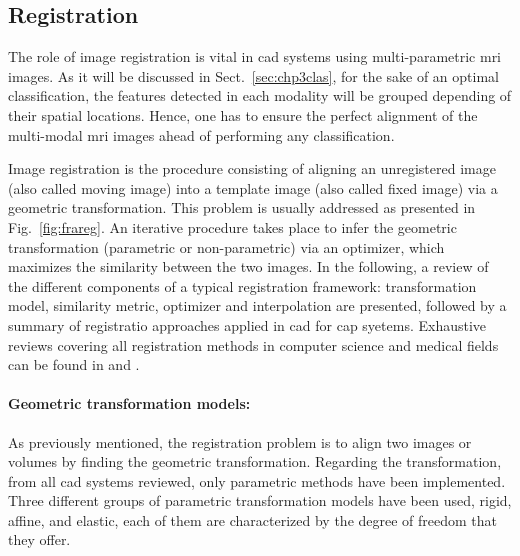 \subsection{Registration}\label{subsec:chp3img-reg:reg}


The role of image registration is vital in \ac{cad} systems using multi-parametric \ac{mri} images. 
As it will be discussed in Sect.~\ref{sec:chp3clas}, for the sake of an optimal classification, the features detected in each modality will be grouped depending of their spatial locations. 
Hence, one has to ensure the perfect alignment of the multi-modal \ac{mri} images ahead of performing any classification.

Image registration is the procedure consisting of aligning an unregistered image (also called moving image) into a template image (also called fixed image) via a geometric transformation.
This problem is usually addressed as presented in Fig.~\ref{fig:frareg}.
An iterative procedure takes place to infer the geometric transformation (parametric or non-parametric) via an optimizer, which maximizes the similarity between the two images.
In the following, a review of the different components of a typical registration framework: transformation model, similarity metric, optimizer and interpolation are presented, followed by a summary of registratio approaches applied in \ac{cad} for \ac{cap} syetems.
Exhaustive reviews covering all registration methods in computer science and medical fields can be found in \cite{Maintz1998} and \cite{Zitova2003}.



\paragraph{Geometric transformation models:}
As previously mentioned, the registration problem is to align two images or volumes by finding the geometric transformation.
Regarding the transformation, from all \ac{cad} systems reviewed, only parametric methods have been implemented.
Three different groups of parametric transformation models have been used, rigid, affine, and elastic, each of them are characterized by the degree of freedom that they offer.

